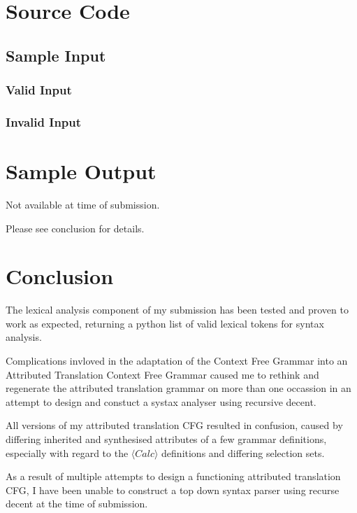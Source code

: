 \documentclass[a4paper,12pt]{article}
\newcommand{\nonterminal}[1]{\langle #1 \rangle}
\begin{document}
\section*{Source Code}

\lstset{language=Python,basicstyle=\footnotesize,fancyvrb=true}



\subsection*{Sample Input}

\subsubsection*{Valid Input}



\subsubsection*{Invalid Input}



\section*{Sample Output}

Not available at time of submission.


Please see conclusion for details.

\section*{Conclusion}

The lexical analysis component of my submission has been tested and
proven to work as expected, returning a python list of valid lexical
tokens for syntax analysis.


Complications invloved in the adaptation of the Context Free Grammar
into an Attributed Translation Context Free Grammar caused me to
rethink and regenerate the attributed translation grammar on more than
one occassion in an attempt to design and constuct a systax analyser
using recursive decent.


All versions of my attributed translation CFG resulted in confusion,
caused by differing inherited and synthesised attributes of a few
grammar definitions, especially with regard to the 
$\nonterminal{Calc}$ definitions and differing selection sets.


As a result of multiple attempts to design a functioning attributed 
translation CFG, I have been unable to construct a top down syntax
parser using recurse decent at the time of submission.
\end{document}
